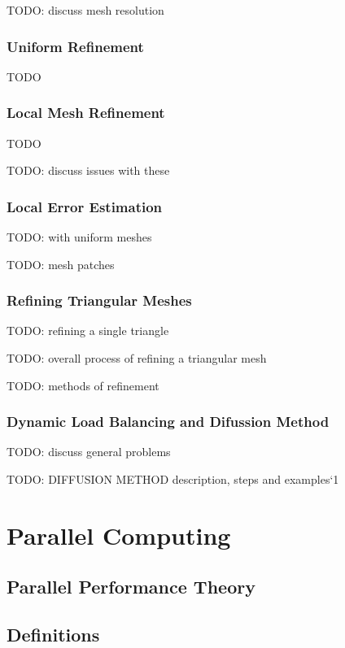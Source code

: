 \documentclass{article}
\begin{document}
TODO: discuss mesh resolution

\subsubsection{Uniform Refinement}

TODO

\subsubsection{Local Mesh Refinement}

TODO

TODO: discuss issues with these

\subsubsection{Local Error Estimation}

TODO: with uniform meshes

TODO: mesh patches

\subsubsection{Refining Triangular Meshes}

TODO: refining a single triangle

TODO: overall process of refining a triangular mesh

TODO: methods of refinement

\subsubsection{Dynamic Load Balancing and Difussion Method}

TODO: discuss general problems

TODO: DIFFUSION METHOD description, steps and examples`1

\section{Parallel Computing}

\subsection{Parallel Performance Theory}

\subsection{Definitions}
\end{document}
